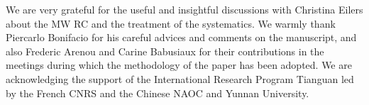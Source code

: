 \documentclass{aa}
\begin{document}
\begin{acknowledgements}

We are very grateful for the useful and insightful discussions with Christina Eilers about the MW RC and the treatment of the systematics. We warmly thank Piercarlo Bonifacio for his careful advices and comments on the manuscript, and also Frederic Arenou and Carine Babusiaux for their contributions in the meetings during which the methodology of the paper has been adopted.  We are acknowledging the support of the International Research Program Tianguan led by the French CNRS and the Chinese NAOC and Yunnan University.

\end{acknowledgements}





 

\end{document}
